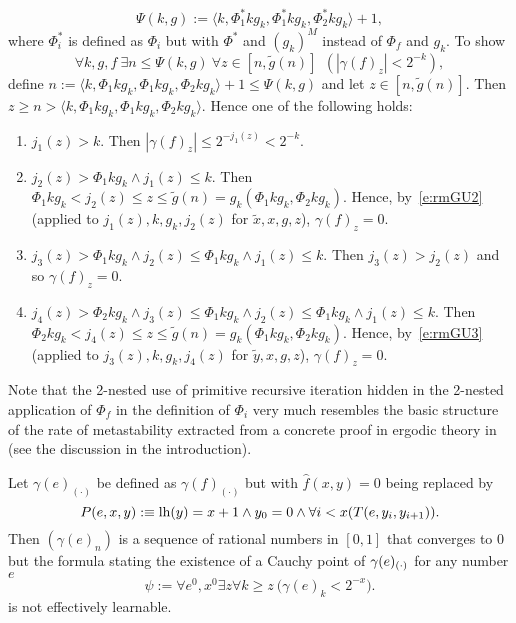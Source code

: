 \begin{rmk}
\[
\Psi(k,g):=\langle k,\Phi^*_1 kg_k,\Phi^*_1 kg_k,\Phi^*_2 kg_k\rangle+1,
\]
where $\Phi^*_i$ is defined as $\Phi_i$ but with $\Phi^*$ and $(g_k)^{M}$ instead of $\Phi_f$ and $g_k$.
To show
\[
\forall k,g,f\ \exists n\leq \Psi(k,g)\ \forall z\in[n,\tilde g(n)]\ \ (|\gamma(f)_z| < 2^{-k}), \] 
define $n:=\langle k,\Phi_1 kg_k,\Phi_1 kg_k,\Phi_2 kg_k\rangle+1\leq \Psi(k,g)$ and let $z\in[n,\tilde g(n)]$. Then 
$z\geq n>\langle k,\Phi_1 kg_k,\Phi_1 kg_k,\Phi_2 kg_k\rangle$. Hence one of the following holds:
\begin{enumerate}
\item $j_1(z)>k$. Then $|\gamma(f)_z|\leq2^{-j_1(z)}<2^{-k}$.
\item $j_2(z)>\Phi_1 kg_k\wedge j_1(z)\leq k$. Then 
$
\Phi_1 kg_k < j_2(z)\leq z \leq \tilde g(n)=g_k(\Phi_1 kg_k,\Phi_2 kg_k).
$
Hence, by~\eqref{e:rmGU2} (applied to $j_1(z),k,g_k,j_2(z)$ for 
$\tilde{x},x,g,z$), $\gamma(f)_z=0$.
\item $j_3(z)>\Phi_1 kg_k\wedge j_2(z)\leq\Phi_1 kg_k\wedge j_1(z)\leq k$. Then $j_3(z)>j_2(z)$ and so $\gamma(f)_z=0$.
\item $j_4(z)>\Phi_2 kg_k\wedge j_3(z)\leq\Phi_1 kg_k\wedge j_2(z)\leq\Phi_1 kg_k\wedge j_1(z)\leq k$. 
Then 
$
\Phi_2 kg_k < j_4(z)\leq z \leq \tilde g(n)=g_k(\Phi_1 kg_k,\Phi_2 kg_k).
$
Hence, by~\eqref{e:rmGU3} (applied to $j_3(z),k,g_k,j_4(z)$ for 
$\tilde{y},x,g,z$), $\gamma(f)_z=0$.
\end{enumerate}
Note that the 2-nested use of primitive recursive iteration hidden in the 
2-nested application of 
$\Phi_f$ in the definition of $\Phi_i$ very much resembles the basic 
structure of the rate of metastability extracted from a concrete proof 
in ergodic theory in \cite{Safarik(11)} (see the discussion in the 
introduction).
\end{rmk}

\begin{cor}\label{c:gammae}
Let $\gamma(e)_{(\cdot)}$ be defined as $\gamma(f)_{(\cdot)}$ but 
with $\widehat{f}(x,y)=0$ being replaced by 
\[ P(e,x,y):\equiv \mbox{\rm lh} (y)=x+1\wedge y_0=0\wedge\forall i<x(T(e,y_i,y_{i+1})).\]  
Then $(\gamma(e)_n)$ is a sequence of rational numbers in $[0,1]$ that 
converges to $0$ but 
the formula stating the existence of a Cauchy point of 
$\gamma(e)_{(\cdot)}$ for any number $e$  
\[
\psi:=\forall e^0,x^0\exists z \forall k\geq z\ \big( \gamma(e)_k<2^{-x} \big).
\]
is not effectively learnable.
\end{cor}

